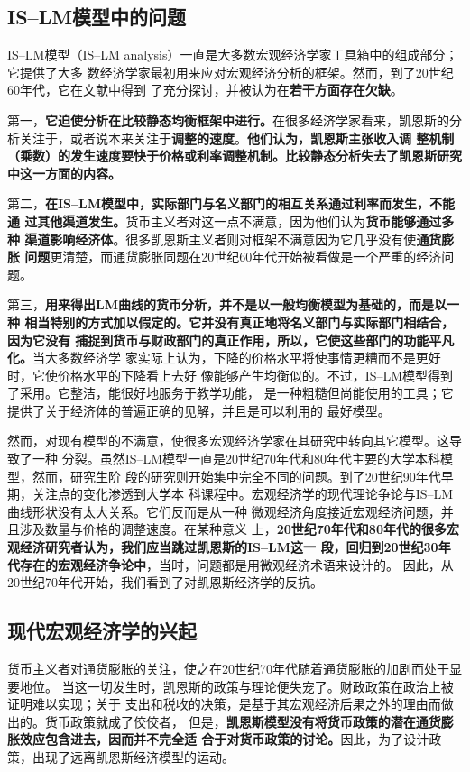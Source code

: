 \subsection{IS--LM模型中的问题}

IS--LM模型（IS--LM analysis）一直是大多数宏观经济学家工具箱中的组成部分；它提供了大多
数经济学家最初用来应对宏观经济分析的框架。然而，到了20世纪60年代，它在文献中得到
了充分探讨，并被认为在\textbf{若干方面存在欠缺}。

第一，\textbf{它迫使分析在比较静态均衡框架中进行。}在很多经济学家看来，凯恩斯的分
析关注于，或者说本来关注于\textbf{调整的速度}。\textbf{他们认为，凯恩斯主张收入调
  整机制（乘数）的发生速度要快于价格或利率调整机制。比较静态分析失去了凯恩斯研究
  中这一方面的内容。}

第二，\textbf{在IS--LM模型中，实际部门与名义部门的相互关系通过利率而发生，不能通
  过其他渠道发生。}货币主义者对这一点不满意，因为他们认为\textbf{货币能够通过多种
  渠道影响经济体}。很多凯恩斯主义者则对框架不满意因为它几乎没有使\textbf{通货膨胀
  问题}更清楚，而通货膨胀同题在20世纪60年代开始被看做是一个严重的经济问题。

第三，\textbf{用来得出LM曲线的货币分析，并不是以一般均衡模型为基础的，而是以一种
  相当特别的方式加以假定的。它并没有真正地将名义部门与实际部门相结合，因为它没有
  捕捉到货币与财政部门的真正作用，所以，它使这些部门的功能平凡化。}当大多数经济学
家实际上认为，下降的价格水平将使事情更糟而不是更好时，它使价格水平的下降看上去好
像能够产生均衡似的。不过，IS--LM模型得到了采用。它整洁，能很好地服务于教学功能，
是一种粗糙但尚能使用的工具；它提供了关于经济体的普遍正确的见解，并且是可以利用的
最好模型。

然而，对现有模型的不满意，使很多宏观经济学家在其研究中转向其它模型。这导致了一种
分裂。虽然IS--LM模型一直是20世纪70年代和80年代主要的大学本科模型，然而，研究生阶
段的研究则开始集中完全不同的问题。到了20世纪90年代早期，关注点的变化渗透到大学本
科课程中。宏观经济学的现代理论争论与IS--LM曲线形状没有太大关系。它们反而是从一种
微观经济角度接近宏观经济问题，并且涉及数量与价格的调整速度。在某种意义
上，\textbf{20世纪70年代和80年代的很多宏观经济研究者认为，我们应当跳过凯恩斯的IS--LM这一
段，回归到20世纪30年代存在的宏观经济争论中}，当时，问题都是用微观经济术语来设计的。
因此，从20世纪70年代开始，我们看到了对凯恩斯经济学的反抗。
\clearpage
\subsection{现代宏观经济学的兴起}

货币主义者对通货膨胀的关注，使之在20世纪70年代随着通货膨胀的加剧而处于显要地位。
当这一切发生时，凯恩斯的政策与理论便失宠了。财政政策在政治上被证明难以实现；关于
支出和税收的决策，是基于其宏观经济后果之外的理由而做出的。货币政策就成了佼佼者，
但是，\textbf{凯恩斯模型没有将货币政策的潜在通货膨胀效应包含进去，因而并不完全适
  合于对货币政策的讨论。}因此，为了设计政策，出现了远离凯恩斯经济模型的运动。

